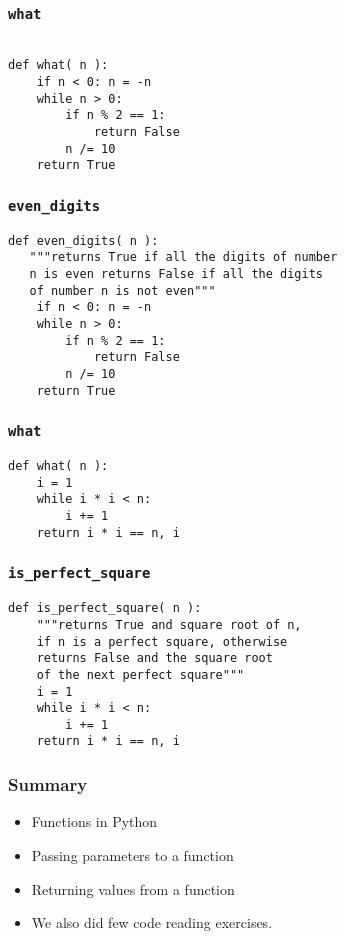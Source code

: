 \documentclass[presentation]{beamer}
\begin{document}
\begin{frame}[fragile]
\frametitle{\texttt{what}}
\label{sec-15}

\begin{verbatim}

def what( n ):
    if n < 0: n = -n
    while n > 0:
        if n % 2 == 1:
            return False
        n /= 10
    return True
\end{verbatim}
\end{frame}
\begin{frame}[fragile]
\frametitle{\texttt{even\_digits}}
\label{sec-16}

\begin{verbatim}
def even_digits( n ):
   """returns True if all the digits of number 
   n is even returns False if all the digits 
   of number n is not even"""
    if n < 0: n = -n
    while n > 0:
        if n % 2 == 1:
            return False
        n /= 10
    return True
\end{verbatim}
\end{frame}
\begin{frame}[fragile]
\frametitle{\texttt{what}}
\label{sec-17}

\begin{verbatim}
def what( n ):
    i = 1
    while i * i < n:
        i += 1
    return i * i == n, i
\end{verbatim}
\end{frame}
\begin{frame}[fragile]
\frametitle{\texttt{is\_perfect\_square}}
\label{sec-18}

\begin{verbatim}
def is_perfect_square( n ):
    """returns True and square root of n, 
    if n is a perfect square, otherwise 
    returns False and the square root 
    of the next perfect square"""
    i = 1
    while i * i < n:
        i += 1
    return i * i == n, i
\end{verbatim}
\end{frame}
\begin{frame}
\frametitle{Summary}
\label{sec-19}

\begin{itemize}
\item Functions in Python
\item Passing parameters to a function
\item Returning values from a function
\item We also did few code reading exercises.
\end{itemize}
\end{frame}
\end{document}
